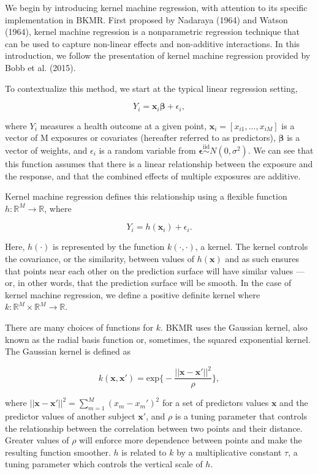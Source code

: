 \documentclass[12pt, twoside]{amherstthesis}
\begin{document}
We begin by introducing kernel machine regression, with attention to its specific implementation in BKMR. First proposed by Nadaraya (1964) and Watson (1964), kernel machine regression is a nonparametric regression technique that can be used to capture non-linear effects and non-additive interactions. In this introduction, we follow the presentation of kernel machine regression provided by Bobb et al. (2015).

To contextualize this method, we start at the typical linear regression setting,

\[
Y_i = \textbf{x}_i\boldsymbol{\beta} + \epsilon_i,
\]

\noindent where \(Y_i\) measures a health outcome at a given point, \(\textbf{x}_i = [x_{i1},\dots,x_{iM}]\) is a vector of M exposures or covariates (hereafter referred to as predictors), \(\boldsymbol{\beta}\) is a vector of weights, and \(\epsilon_i\) is a random variable from \(\boldsymbol\epsilon \overset{\mathrm{iid}}{\sim} N(0, \sigma^2)\). We can see that this function assumes that there is a linear relationship between the exposure and the response, and that the combined effects of multiple exposures are additive.

Kernel machine regression defines this relationship using a flexible function \(h: \mathbb{R}^M \rightarrow \mathbb{R}\), where

\[
Y_i = h(\textbf{x}_i) + \epsilon_i.
\]

\noindent Here, \(h(\cdot)\) is represented by the function \(k(\cdot, \cdot)\), a kernel. The kernel controls the covariance, or the similarity, between values of \(h(\textbf{x})\) and as such ensures that points near each other on the prediction surface will have similar values --- or, in other words, that the prediction surface will be smooth. In the case of kernel machine regression, we define a positive definite kernel where \(k: \mathbb{R}^M\times \mathbb{R}^M \rightarrow \mathbb{R}\).

There are many choices of functions for \(k\). BKMR uses the Gaussian kernel, also known as the radial basis function or, sometimes, the squared exponential kernel. The Gaussian kernel is defined as

\[
k(\textbf{x}, \textbf{x}') = \textrm{exp}\bigg\{
-\frac{||\textbf{x}-\textbf{x}'||^2}{\rho} \bigg\},
\]

\noindent where \(||\textbf{x}-\textbf{x}'||^2 = \sum_{m=1}^M{(x_{m}-x_{m}')^2}\) for a set of predictors values \(\textbf{x}\) and the predictor values of another subject \(\textbf{x}'\), and \(\rho\) is a tuning parameter that controls the relationship between the correlation between two points and their distance. Greater values of \(\rho\) will enforce more dependence between points and make the resulting function smoother. \(h\) is related to \(k\) by a multiplicative constant \(\tau\), a tuning parameter which controls the vertical scale of \(h\).
\end{document}
